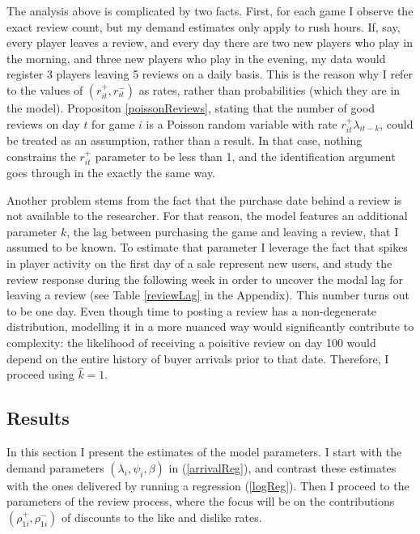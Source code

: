 \documentclass[12pt,pagebackref]{article}
\begin{document}
The analysis above is complicated by two facts. First, for each game I
observe the exact review count, but my demand estimates only apply to
rush hours. If, say, every player leaves a review, and every day there
are two new players who play in the morning, and three new players who
play in the evening, my data would register 3 players leaving 5 reviews
on a daily basis. This is the reason why I refer to the values of
\((r_{it}^+, r_{it}^-)\) as rates, rather than probabilities (which they
are in the model). Propositon \ref{poissonReviews}, stating that the
number of good reviews on day \(t\) for game \(i\) is a Poisson random
variable with rate \(r_{it}^+\lambda_{it-k}\), could be treated as an
assumption, rather than a result. In that case, nothing constrains the
\(r_{it}^+\) parameter to be less than 1, and the identification
argument goes through in the exactly the same way.

Another problem stems from the fact that the purchase date behind a
review is not available to the researcher. For that reason, the model
features an additional parameter \(k\), the lag between purchasing the
game and leaving a review, that I assumed to be known. To estimate that
parameter I leverage the fact that spikes in player activity on the
first day of a sale represent new users, and study the review response
during the following week in order to uncover the modal lag for leaving
a review (see Table \ref{reviewLag} in the Appendix). This number turns
out to be one day. Even though time to posting a review has a
non-degenerate distribution, modelling it in a more nuanced way would
significantly contribute to complexity: the likelihood of receiving a
poisitive review on day 100 would depend on the entire history of buyer
arrivals prior to that date. Therefore, I proceed using \(\hat k = 1\).

\hypertarget{results}{%
\subsection{Results}\label{results}}

In this section I present the estimates of the model parameters. I start
with the demand parameters \((\lambda_i, \psi_i, \beta)\) in
(\ref{arrivalReg}), and contrast these estimates with the ones delivered
by running a regression (\ref{logReg}). Then I proceed to the parameters
of the review process, where the focus will be on the contributions
\((\rho_{1i}^+, \rho_{1i}^-)\) of discounts to the like and dislike
rates.
\end{document}
